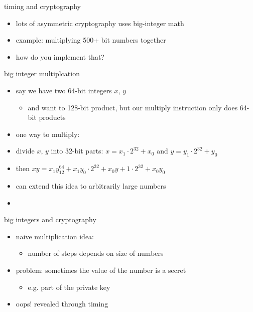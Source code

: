 \begin{frame}{timing and cryptography}
    \begin{itemize}
    \item lots of asymmetric cryptography uses big-integer math
    \item example: multiplying 500+ bit numbers together
    \vspace{.5cm}
    \item how do you implement that?
    \end{itemize}
\end{frame}

\begin{frame}{big integer multiplcation}
    \begin{itemize}
    \item say we have two 64-bit integers $x$, $y$
        \begin{itemize}
        \item and want to 128-bit product, but our multiply instruction only does 64-bit products
        \end{itemize}
    \item one way to multiply:
    \vspace{.5cm}
    \item divide $x$, $y$ into 32-bit parts: $x=x_1\cdot2^{32}+x_0$ and $y=y_1\cdot2^{32}+y_0$
    \item then $xy = x_1y_12^{64}+x_1y_0\cdot2^{32}+x_0y+1\cdot2^{32}+x_0y_0$
    \vspace{.5cm}
    \item<2-> can extend this idea to arbitrarily large numbers
    \item<2-> 
    \end{itemize}
\end{frame}

\begin{frame}{big integers and cryptography}
    \begin{itemize}
    \item naive multiplication idea:
        \begin{itemize}
        \item number of steps depends on size of numbers
        \end{itemize}
    \item problem: sometimes the value of the number is a secret
        \begin{itemize}
        \item e.g. part of the private key
        \end{itemize}
    \item oops! revealed through timing
    \end{itemize}
\end{frame}


